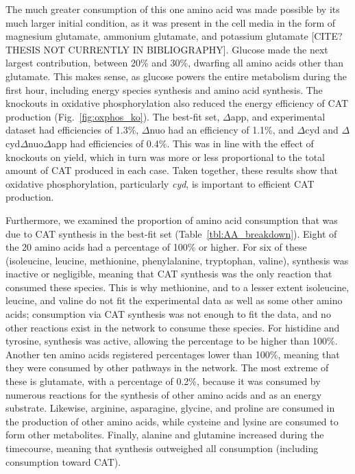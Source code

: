 \documentclass[12pt]{article}
\begin{document}
The much greater consumption of this one amino acid was made possible by its much larger initial condition, as it was present in the cell media in the form of magnesium glutamate, ammonium glutamate, and potassium glutamate [CITE? THESIS NOT CURRENTLY IN BIBLIOGRAPHY].
Glucose made the next largest contribution, between 20\% and 30\%, dwarfing all amino acids other than glutamate.
This makes sense, as glucose powers the entire metabolism during the first hour, including energy species synthesis and amino acid synthesis.
The knockouts in oxidative phosphorylation also reduced the energy efficiency of CAT production  (Fig.~\ref{fig:oxphos_ko}).
The best-fit set, $\Delta$app, and experimental dataset had efficiencies of 1.3\%, $\Delta$nuo had an efficiency of 1.1\%, and $\Delta$cyd and $\Delta$cyd$\Delta$nuo$\Delta$app had efficiencies of 0.4\%.
This was in line with the effect of knockouts on yield, which in turn was more or less proportional to the total amount of CAT produced in each case.
Taken together, these results show that oxidative phosphorylation, particularly \textit{cyd}, is important to efficient CAT production.

Furthermore, we examined the proportion of amino acid consumption that was due to CAT synthesis in the best-fit set (Table~\ref{tbl:AA_breakdown}).
Eight of the 20 amino acids had a percentage of 100\% or higher.
For six of these (isoleucine, leucine, methionine, phenylalanine, tryptophan, valine), synthesis was inactive or negligible, meaning that CAT synthesis was the only reaction that consumed these species.
This is why methionine, and to a lesser extent isoleucine, leucine, and valine do not fit the experimental data as well as some other amino acids; consumption via CAT synthesis was not enough to fit the data, and no other reactions exist in the network to consume these species.
For histidine and tyrosine, synthesis was active, allowing the percentage to be higher than 100\%.
Another ten amino acids registered percentages lower than 100\%, meaning that they were consumed by other pathways in the network.
The most extreme of these is glutamate, with a percentage of 0.2\%, because it was consumed by numerous reactions for the synthesis of other amino acids and as an energy substrate.
Likewise, arginine, asparagine, glycine, and proline are consumed in the production of other amino acids, while cysteine and lysine are consumed to form other metabolites.
Finally, alanine and glutamine increased during the timecourse, meaning that synthesis outweighed all consumption (including consumption toward CAT).
\end{document}
